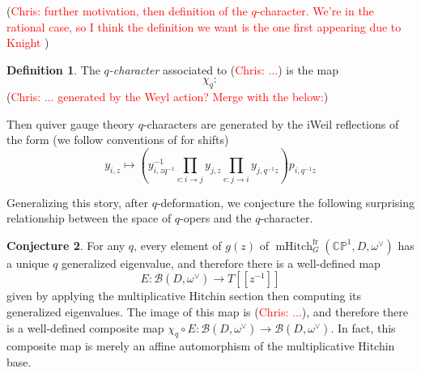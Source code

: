 \documentclass[11pt, oneside, reqno]{amsart}
\theoremstyle{definition} \newtheorem{definition}{Definition}[section]
\newtheorem{conjecture}[definition]{Conjecture}
\theoremstyle{definition} \newtheorem{remark}[definition]{Remark}
\theoremstyle{definition} \newtheorem{remarks}[definition]{Remarks}
\theoremstyle{definition} \newtheorem{question}[definition]{Question}
\theoremstyle{definition} \newtheorem*{note}{Note}
\theoremstyle{definition} \newtheorem{example}[definition]{Example}
\theoremstyle{definition} \newtheorem{examples}[definition]{Examples}
\newcommand{\bb}[1]{\mathbb{#1}}
\newcommand{\mc}[1]{\mathcal{#1}}
\DeclareMathOperator{\mhitch}{mHitch}
\newcommand{\fr}{\mathrm{fr}}
\newcommand{\chris}[1]{(\textcolor{red}{Chris: #1})}
\begin{document}
\chris{further motivation, then definition of the $q$-character.  We're in the rational case, so I think the definition we want is the one first appearing due to Knight \cite{Knight}}
\begin{definition}
The \emph{$q$-character} associated to \chris{...} is the map
\[\chi_q \colon \]
\chris{... generated by the Weyl action?  Merge with the below:}

Then quiver gauge theory $q$-characters are generated by the iWeil reflections of the form
 \cite{NekrasovPestun,NekrasovPestunShatashvili,Nekrasov:2015wsu} (we follow conventions of \cite{Kimura:2015rgi} for shifts)
\begin{equation}
  y_{i,z} \mapsto    (y_{i, z q^{-1}}^{-1} \prod_{e: i \to j} y_{j, z} \prod_{e: j\to i} y_{j,q^{-1} z})  p_{i, q^{-1} z}
\end{equation}
\end{definition}

Generalizing this story, after $q$-deformation, we conjecture the following surprising relationship between the space of $q$-opers and the $q$-character.
 
\begin{conjecture} \label{qchar_conjecture}
For any $q$, every element of $g(z)$ of $\mhitch^\fr_G(\bb{CP}^1, D, \omega^\vee)$ has a unique $q$ generalized eigenvalue, and therefore there is a well-defined map
\[E \colon \mc B(D,\omega^\vee) \to T[[z^{-1}]]\]
given by applying the multiplicative Hitchin section then computing its generalized eigenvalues.  The image of this map is \chris{...}, and therefore there is a well-defined composite map $\chi_q \circ E \colon \mc B(D,\omega^\vee) \to \mc B(D,\omega^\vee)$.  In fact, this composite map is merely an affine automorphism of the multiplicative Hitchin base.
\end{conjecture}
\end{document}
